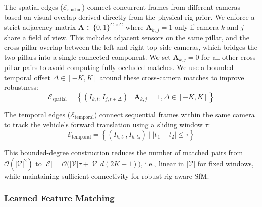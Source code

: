 \documentclass[letterpaper, 10 pt, conference]{ieeeconf}  %
\begin{document}
The spatial edges ($\mathcal{E}_{\text{spatial}}$) connect concurrent frames from different cameras based on visual overlap derived directly from the physical rig prior. We enforce a strict adjacency matrix $\mathbf{A} \in \{0,1\}^{C \times C}$ where $\mathbf{A}_{k,j} = 1$ only if camera $k$ and $j$ share a field of view. This includes adjacent sensors on the same pillar, and the cross-pillar overlap between the left and right top side cameras, which bridges the two pillars into a single connected component. We set $\mathbf{A}_{k,j} = 0$ for all other cross-pillar pairs to avoid computing fully occluded matches. We use a bounded temporal offset $\Delta \in [-K, K]$ around these cross-camera matches to improve robustness:
\begin{equation}
    \mathcal{E}_{\text{spatial}} = \left\{ (I_{k,t}, I_{j,t+\Delta}) \mid \mathbf{A}_{k,j} = 1, \Delta \in [-K, K] \right\}
\end{equation}

The temporal edges ($\mathcal{E}_{\text{temporal}}$) connect sequential frames within the same camera to track the vehicle's forward translation using a sliding window $\tau$:
\begin{equation}
    \mathcal{E}_{\text{temporal}} = \left\{ (I_{k,t_1}, I_{k,t_2}) \mid |t_1 - t_2| \leq \tau \right\}
\end{equation}

This bounded-degree construction reduces the number of matched pairs from $\mathcal{O}(|\mathcal{V}|^2)$ to
$|\mathcal{E}|=\mathcal{O}\!\big(|\mathcal{V}|\tau + |\mathcal{V}|\,d(2K+1)\big)$,
i.e., linear in $|\mathcal{V}|$ for fixed windows, while maintaining sufficient connectivity for robust rig-aware SfM.









\subsubsection{Learned Feature Matching}


\end{document}
